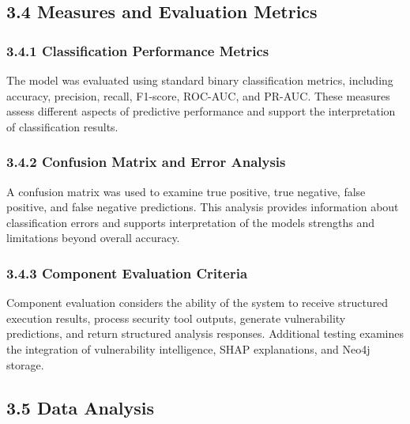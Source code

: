 \documentclass[
]{article}
\begin{document}
\hypertarget{measures-and-evaluation-metrics}{%
\subsection{3.4 Measures and Evaluation
Metrics}\label{measures-and-evaluation-metrics}}

\hypertarget{classification-performance-metrics}{%
\subsubsection{3.4.1 Classification Performance
Metrics}\label{classification-performance-metrics}}

The model was evaluated using standard binary classification metrics,
including accuracy, precision, recall, F1-score, ROC-AUC, and PR-AUC.
These measures assess different aspects of predictive performance and
support the interpretation of classification results.

\hypertarget{confusion-matrix-and-error-analysis}{%
\subsubsection{3.4.2 Confusion Matrix and Error
Analysis}\label{confusion-matrix-and-error-analysis}}

A confusion matrix was used to examine true positive, true negative,
false positive, and false negative predictions. This analysis provides
information about classification errors and supports interpretation of
the model\textquotesingle s strengths and limitations beyond overall
accuracy.

\hypertarget{component-evaluation-criteria}{%
\subsubsection{3.4.3 Component Evaluation
Criteria}\label{component-evaluation-criteria}}

Component evaluation considers the ability of the system to receive
structured execution results, process security tool outputs, generate
vulnerability predictions, and return structured analysis responses.
Additional testing examines the integration of vulnerability
intelligence, SHAP explanations, and Neo4j storage.

\hypertarget{data-analysis}{%
\subsection{3.5 Data Analysis}\label{data-analysis}}
\end{document}
